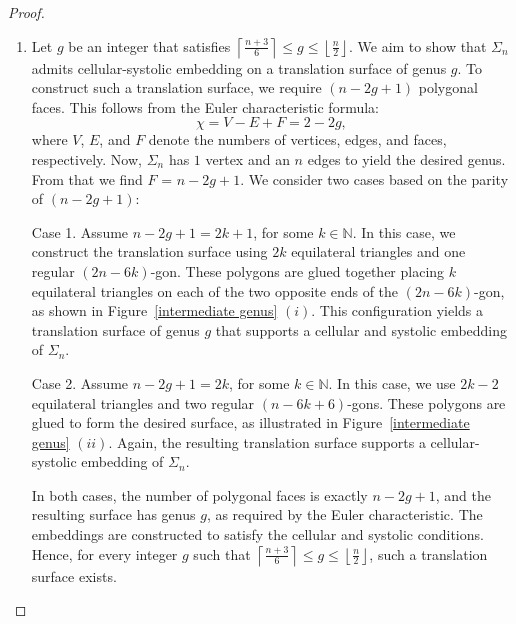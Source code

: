 \documentclass[11pt]{amsart}
\theoremstyle{plain}
\theoremstyle{definition}
\theoremstyle{remark}
\numberwithin{equation}{section}
\numberwithin{figure}{section}
\begin{document}
\begin{proof}
\begin{enumerate}
\item
Let $g$ be an integer that satisfies $\left\lceil \frac{n+3}{6} \right\rceil\le g\le\left\lfloor \frac{n}{2} \right\rfloor$. We aim to show that \( \Sigma_n \) admits cellular-systolic embedding on a translation surface of genus $g$.
To construct such a translation surface, we require \( (n - 2g + 1) \) polygonal faces. This follows from the Euler characteristic formula:
$$\chi = V - E + F = 2 - 2g,$$
where \( V \), \( E \), and \( F \) denote the numbers of vertices, edges, and faces, respectively. Now, \( \Sigma_n \) has \( 1 \) vertex and an $n$ edges to yield the desired genus. From that we find \( F \) = \(n-2g+1\).
We consider two cases based on the parity of \( (n - 2g + 1) \):

Case 1. Assume \( n - 2g + 1 = 2k + 1 \), for some \( k \in \mathbb{N} \). In this case, we construct the translation surface using \( 2k \) equilateral triangles and one regular \( (2n - 6k) \)-gon. These polygons are glued together placing \( k \) equilateral triangles on each of the two opposite ends of the \( (2n - 6k) \)-gon, as shown in Figure~\ref{intermediate genus} $(i)$. This configuration yields a translation surface of genus \( g \) that supports a cellular and systolic embedding of \( \Sigma_n \).

Case 2. Assume \( n - 2g + 1 = 2k \), for some \( k \in \mathbb{N} \). In this case, we use \( 2k - 2 \) equilateral triangles and two regular \( (n - 6k + 6) \)-gons. These polygons are glued to form the desired surface, as illustrated in Figure~\ref{intermediate genus} $(ii)$. Again, the resulting translation surface supports a cellular-systolic embedding of \( \Sigma_n \).

In both cases, the number of polygonal faces is exactly \( n - 2g + 1 \), and the resulting surface has genus \( g \), as required by the Euler characteristic. The embeddings are constructed to satisfy the cellular and systolic conditions. Hence, for every integer \( g \) such that $\left\lceil \frac{n+3}{6} \right\rceil\le g\le\left\lfloor \frac{n}{2} \right\rfloor$, such a translation surface exists.
\end{enumerate}
\end{proof}
\end{document}

